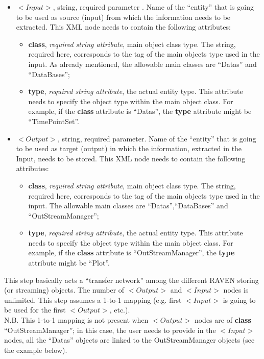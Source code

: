 \begin{itemize}
\item $<Input>$, string, required parameter . Name of the ``entity'' that is going to be used as source (input) from which the information needs to be extracted. This XML node needs to contain the following attributes:
\begin{itemize}
  \item \textbf{class}, \textit{required string attribute}, main object class type. The string, required here, corresponds to the tag of the main objects type used in the input. As already mentioned, the allowable main classes are ``Datas''  and ``DataBases'';
  \item \textbf{type}, \textit{required string attribute}, the actual entity type. This attribute needs to specify the object type within the main object class. For example, if the  \textbf{class} attribute is ``Datas'', the \textbf{type} attribute might be ``TimePointSet''.
\end{itemize}
\item $<Output>$, string, required parameter. Name of the ``entity'' that is going to be used as target (output) in which the information, extracted in the Input, needs to be stored. This XML node needs to contain the following attributes:
\begin{itemize}
  \item \textbf{class}, \textit{required string attribute}, main object class type. The string, required here, corresponds to the tag of the main objects type used in the input. The allowable main classes are ``Datas'',``DataBases'' and ``OutStreamManager'';
  \item \textbf{type}, \textit{required string attribute}, the actual entity type. This attribute needs to specify the object type within the main object class. For example, if the  \textbf{class} attribute is ``OutStreamManager'', the \textbf{type} attribute might be ``Plot''.
\end{itemize}
\end{itemize}
This step basically acts a ``transfer network'' among the different RAVEN storing (or streaming) objects. The number of $<Output>$ and $<Input>$ nodes is unlimited. This step assumes a 1-to-1 mapping (e.g. first $<Input>$ is going to be used for the first $<Output>$, etc.). \\ N.B. This 1-to-1 mapping is not present when $<Output>$ nodes are of  \textbf{class} ``OutStreamManager''; in this case, the user needs to provide in the $<Input>$ nodes, all the ``Datas'' objects are linked to the OutStreamManager objects (see the example below).
